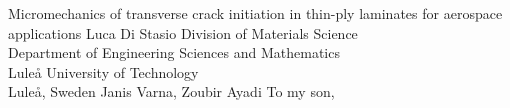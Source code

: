 \documentclass[12pt,a4paper,openright,final,twoside]{cseethesis}
\begin{document}
\def\thesistitle{Micromechanics of transverse crack initiation in thin-ply laminates for aerospace applications}
\def\theauthor{Luca Di Stasio}
\def\theaddress{Division of Materials Science\\Department of Engineering Sciences and Mathematics\\
Lule{\aa} University of Technology\\ Lule{\aa}, Sweden}

\def\supervisors{Janis Varna, Zoubir Ayadi}
\def\supervisorstring{Supervisors:} %
\def\dedication{To my son, }

\def\theabstract{}
\def\thepreface{}



\def\thelogo{} %


\startpreamble
  {\thesistitle}
  {\theauthor}
  {\theaddress}
  {\supervisors}
  {\dedication}
  {\theabstract}
  {\thepreface}
  {\thelogo}

\end{document}
